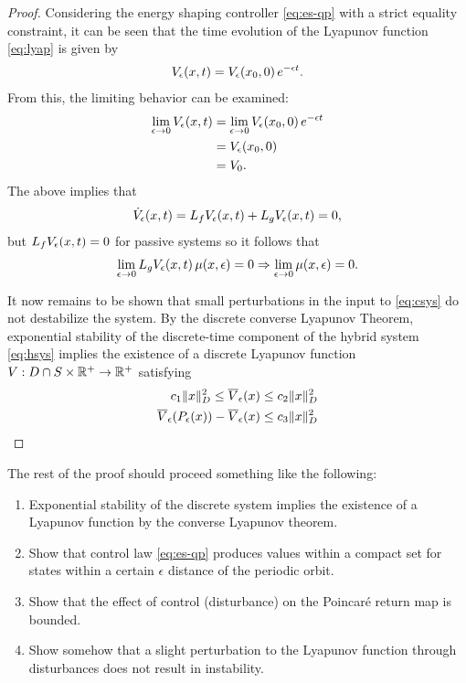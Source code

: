 \documentclass[twocolumn]{article}
\newcommand{\limeps}{\lim_{\epsilon \to 0}}
\begin{document}
\begin{proof}
  Considering the energy shaping controller \eqref{eq:es-qp} with a strict equality constraint, it can be seen that the time evolution of the Lyapunov function \eqref{eq:lyap} is given by
  \begin{align*}
    V_{\epsilon}(x, t) = V_{\epsilon}(x_{0}, 0) \, e^{-\epsilon t}.
  \end{align*}
  From this, the limiting behavior can be examined:
  \begin{align*}
    \limeps \Ve(x, t) &= \limeps \Ve(x_{0}, 0) \, e^{-\epsilon t}\\
    &= \Ve(x_{0}, 0)\\
    &= V_0.
  \end{align*}
  The above implies that
  \begin{align*}
    {\dot V}_{\epsilon}(x, t) = L_{f} V_{\epsilon}(x, t) + L_{g} V_{\epsilon}(x, t) = 0,
  \end{align*}
  but $L_{f} V_{\epsilon}(x, t) = 0$ for passive systems so it follows that
  \begin{align*}
    \limeps L_{g} \Ve(x, t) \, \mu(x, \epsilon) = 0 \Rightarrow \limeps \mu(x, \epsilon) = 0.
  \end{align*}

  It now remains to be shown that small perturbations in the input to \eqref{eq:csys} do not destabilize the system.
  By the discrete converse Lyapunov Theorem, exponential stability of the discrete-time component of the hybrid system \eqref{eq:hsys} implies the existence of a discrete Lyapunov function $V : D \cap S \times \mathbb{R}^{+} \to \mathbb{R}^{+}$ satisfying
  \begin{align*}
    c_{1} \| x \|^{2}_{D} \leq \overline{V}_{\epsilon}(x) \leq c_{2} \| x \|_{D}^2\\
    \overline{V}_{\epsilon}(P_{\epsilon}(x)) - \overline{V}_{\epsilon}(x) \leq c_{3} \| x \|^{2}_{D}
  \end{align*}

\end{proof}

The rest of the proof should proceed something like the following:
\begin{enumerate}
\item Exponential stability of the discrete system implies the existence of a Lyapunov function by the converse Lyapunov theorem.
\item Show that control law \eqref{eq:es-qp} produces values within a compact set for states within a certain $\epsilon$ distance of the periodic orbit.
\item Show that the effect of control (disturbance) on the Poincar{\'e} return map is bounded.
\item Show somehow that a slight perturbation to the Lyapunov function through disturbances does not result in instability.
\end{enumerate}
\end{document}
